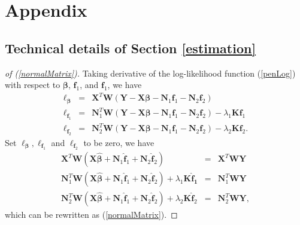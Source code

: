 \documentclass[article,lineno]{biometrika}
\begin{document}
\appendixtwo
\section*{Appendix} \label{appendix1}
\subsection*{Technical details of Section \ref{estimation}} 

%
%
%
\begin{proof}[of (\ref{normalMatrix})]
Taking derivative of the log-likelihood function (\ref{penLog}) with respect to $\bm \beta$, $\bm f_1$, and $\bm f_1$, we have
\begin{eqnarray*}
\ell_{\bm \beta} &=&\boldsymbol X^T  \boldsymbol W
(\boldsymbol Y - \boldsymbol X \boldsymbol \beta 
- \boldsymbol N_1 \boldsymbol f_1 -
\boldsymbol N_2 \boldsymbol f_2) \\
\ell_{\bm f_1}
&=&
\boldsymbol N_1^T  \boldsymbol W
(\boldsymbol Y - \boldsymbol X \boldsymbol \beta - \boldsymbol N_1 \boldsymbol f_1 -
\boldsymbol N_2 \boldsymbol f_2)
- \lambda_1 \bm K \bm f_1 \\
\ell_{\boldsymbol f_2} 
&=& 
\boldsymbol N_2^T  \boldsymbol W
(\boldsymbol Y - \boldsymbol X \boldsymbol \beta - \boldsymbol N_1 \boldsymbol f_1 -
\boldsymbol N_2 \boldsymbol f_2)
- \lambda_2 \boldsymbol K  \boldsymbol f_2.
\end{eqnarray*}
Set $\ell_{\bm \beta}, \ell_{\bm f_1}$ and $\ell_{\bm f_2}$ to be zero, we have 
\begin{eqnarray}
\boldsymbol X^T  \boldsymbol W
(\boldsymbol X \boldsymbol {\hat \beta} 
+  \boldsymbol N_1 \boldsymbol {\hat f}_1
+  \boldsymbol N_2 \boldsymbol {\hat f}_2)
&=&  \boldsymbol X^T  \boldsymbol W \boldsymbol Y 
\label{normal_beta} \\
\boldsymbol N_1^T  \boldsymbol W
(\boldsymbol X \boldsymbol {\hat \beta} +  \boldsymbol N_1 \boldsymbol {\hat f}_1 
+ \boldsymbol N_2 \boldsymbol {\hat f}_2) 
+ \lambda_1 \boldsymbol K \boldsymbol {\hat f_1}
&=&
\boldsymbol N_1^T  \boldsymbol W \boldsymbol Y  
\label{normal_f1} \\
\boldsymbol N_2^T  \boldsymbol W
(\boldsymbol X \boldsymbol {\hat \beta} +  \boldsymbol N_1 \boldsymbol {\hat f}_1 
+ \boldsymbol N_2 \boldsymbol {\hat f}_2) 
+
\lambda_2 \boldsymbol K\boldsymbol {\hat f}_2
&=&  
\boldsymbol N_2^T  \boldsymbol W \boldsymbol Y,
 \label{normal_f2} 
\end{eqnarray}
which can be rewritten as (\ref{normalMatrix}).
\end{proof}
\end{document}
